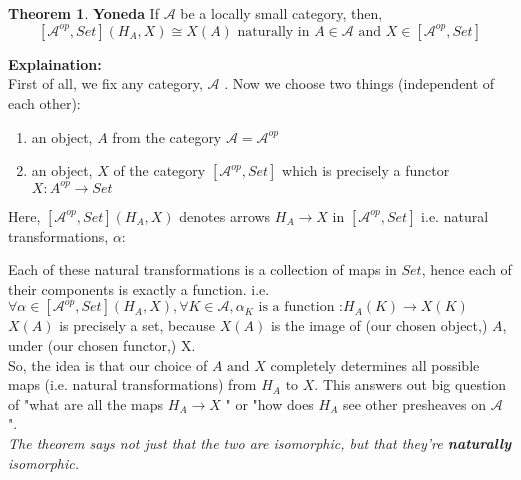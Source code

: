\documentclass[18pt,a4paper]{extarticle}
\theoremstyle{definition}
\newtheorem{theorem}{Theorem}[section]
\theoremstyle{definition}
\begin{document}
\section{}
\begin{theorem}{\textbf{Yoneda}} %
	If $\mathcal{A} $ be a locally small category, then, \\
	\[ [ \mathcal{A} ^{op},Set ](H_A,X) \cong X(A) \text{ naturally in } A \in \mathcal{A} \text{ and }
	X \in [ \mathcal{A}^{op},Set]\]
\end{theorem}
\textbf{Explaination:} \\
First of all, we fix any category, $\mathcal{A} $ . Now we choose two things (independent of each other):
\begin{enumerate}[label=\roman*]
	\item an object, $A$ from the category $ \mathcal{A}= \mathcal{A} ^{op} $
	\item an object, $X$ of the category $[ \mathcal{A}^{op},Set] $
		which is precisely a functor $X: A^{op} \rightarrow Set$
\end{enumerate}
Here, $[ \mathcal{A}^{op},Set](	H_A,X) $ denotes arrows $H_A \rightarrow X$ in $[ \mathcal{A}^{op},Set] $
i.e. natural transformations, $\alpha :$
	Each of these natural transformations is a collection of maps in $Set$, hence each of their
	components is exactly a function. i.e.
	$\forall \alpha \in [ \mathcal{A}^{op},Set](H_A,X), \forall K \in \mathcal{A}, \alpha_K \text{ is a function :} H_A(K) \to X(K)$\\

$X(A)$ is precisely a set, because $X(A)$ is the image of (our chosen object,) $A$, under (our chosen functor,) X. \\

So, the idea is that our choice of $A \text{ and } X$ completely determines all possible maps
(i.e. natural transformations) from $H_A \text{ to } X$. This answers out big question of "what are all the maps
$H_A  \rightarrow X$ " or "how does $H_A$ see other presheaves on $\mathcal{A} $ ".\\

\textit{The theorem says not just that the two are isomorphic, but that they're \textbf{naturally} isomorphic.}
\end{document}
